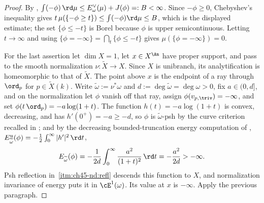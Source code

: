 \begin{proof}
By , $\int(-\phi)\,\rd\mu\le
E^\vee_\omega(\mu)+J(\phi)=:B<\infty$.  Since $-\phi\ge0$, Chebyshev's
inequality gives $t\,\mu(\{-\phi\ge t\})\le\int(-\phi)\rd\mu\le B$, which
is the displayed estimate; the set $\{\phi\le-t\}$ is Borel because
$\phi$ is upper semicontinuous.  Letting $t\to\infty$ and using
$\{\phi=-\infty\}=\bigcap_t\{\phi\le-t\}$ gives $\mu(\{\phi=-\infty\})=0$.

For the last assertion let $\dim X=1$, let $x\in X^{\An}$ have proper
support, and pass to the smooth normalization
$\nu:\widetilde X\to X$. Since $X$ is unibranch, its analytification
is homeomorphic to that of $\widetilde X$. The point above $x$ is the
endpoint of a ray through $\ord_p$ for $p\in\widetilde X(k)$.
Write $\widetilde\omega:=\nu^*\omega$ and
$d:=\deg\widetilde\omega=\deg\omega>0$, fix $a\in(0,d]$, and
on the normalization let $\phi$ vanish off that ray, assign
$\phi(v_{p,\triv})=-\infty$, and set
$\phi(t\,\ord_p)=-a\log(1+t)$.  The function $h(t)=-a\log(1+t)$ is
convex, decreasing, and has $h'(0^+)=-a\ge-d$, so $\phi$ is
$\widetilde\omega$-psh by the curve criterion recalled in
; and by the decreasing bounded-truncation energy computation of
,
$E^{\mathrm u}_{\widetilde\omega}(\phi)=-\tfrac12\int_0^\infty|h'|^2\,\rd t$,
\[
 E_{\widetilde\omega}(\phi)=-\frac{1}{2d}\int_0^\infty\frac{a^2}{(1+t)^2}\,\rd t
 =-\frac{a^2}{2d}>-\infty .
\]
Psh reflection in \,\cref{itm:ch45-nd:refl} descends this
function to $X$, and normalization invariance of energy
\cite[Proposition~7.7(iv)]{BJ22} puts it in $\cE^1(\omega)$. Its value
at $x$ is $-\infty$. Apply the previous paragraph.
\end{proof}

